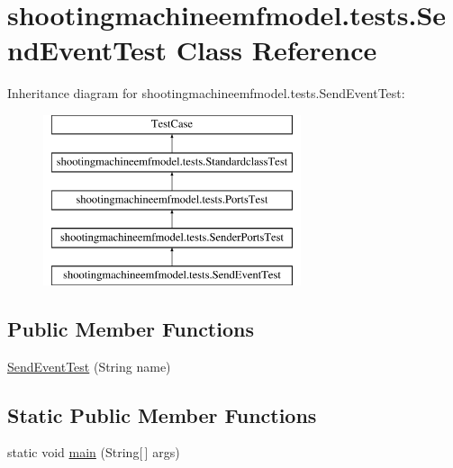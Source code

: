 \hypertarget{classshootingmachineemfmodel_1_1tests_1_1_send_event_test}{\section{shootingmachineemfmodel.\-tests.\-Send\-Event\-Test Class Reference}
\label{classshootingmachineemfmodel_1_1tests_1_1_send_event_test}
}
Inheritance diagram for shootingmachineemfmodel.\-tests.\-Send\-Event\-Test\-:\begin{figure}[H]
\begin{center}
\leavevmode
\includegraphics[height=5.000000cm]{classshootingmachineemfmodel_1_1tests_1_1_send_event_test}
\end{center}
\end{figure}
\subsection*{Public Member Functions}
\begin{DoxyCompactItemize}
\item 
\hyperlink{classshootingmachineemfmodel_1_1tests_1_1_send_event_test_a2778818158433b23cf581e6628e52de9}{Send\-Event\-Test} (String name)
\end{DoxyCompactItemize}
\subsection*{Static Public Member Functions}
\begin{DoxyCompactItemize}
\item 
static void \hyperlink{classshootingmachineemfmodel_1_1tests_1_1_send_event_test_a76f9c78795df2dad01747533c23b62da}{main} (String\mbox{[}$\,$\mbox{]} args)
\end{DoxyCompactItemize}
